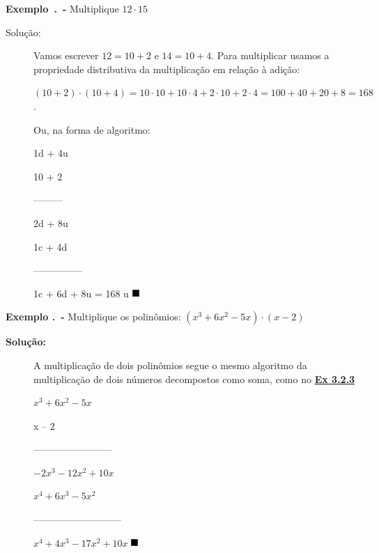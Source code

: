 \textbf{Exemplo~\thesubsection.\theexemplo~-} Multiplique $12 \cdot 15$ \label{ex:3.2.3}

\begin{description}
\item[Solução:]
Vamos escrever $12 = 10 + 2$ e $14 = 10 + 4$. Para multiplicar usamos a propriedade distributiva da multiplicação em relação à adição:

$(10 + 2) \cdot  (10 + 4) = 10 \cdot 10 + 10 \cdot 4 + 2 \cdot 10 + 2 \cdot 4 = 100 + 40 + 20 + 8 = 168$.

Ou, na forma de algoritmo:
\newpage


\hspace{7mm} 1d + 4u

\hspace{7mm} 10 + 2

\hspace{7mm} ---------

\hspace{7mm} 2d    + 8u

\hspace{-1mm} 1c  + 4d

            ---------------

            1c + 6d + 8u        = 168 u $\qedsymbol$


\end{description}

\noindent\textbf{Exemplo \thesubsection.\theexemplo~-} Multiplique os polinômios: $(x^3 + 6x^2 - 5x) \cdot (x - 2)$

\begin{description}
\item[\textbf{Solução:}]
A multiplicação de dois polinômios segue o mesmo algoritmo da multiplicação de dois números decompostos como soma, como no \hyperref[ex:3.2.3]{\textbf{Ex 3.2.3}}

\hspace{8mm}$x^3 + 6x^2 - 5x$
                
\hspace{23mm}x – 2
		      			 
\hspace{4mm}------------------------
				
\hspace{4mm} $-2x^3 -12x^2  + 10x$
       		       	          
$x^4 +6x^3 -5x^2 $ 
		                
---------------------------
			
$x^4  +  4x^3  -17x^2  + 10x$ $\qedsymbol$
\end{description}


